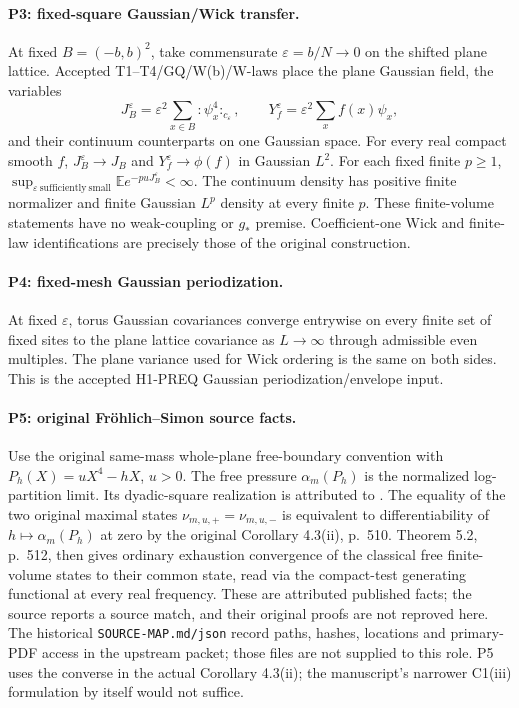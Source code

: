 \documentclass[11pt]{article}
\theoremstyle{plain}
\theoremstyle{definition}
\theoremstyle{remark}
\newcommand{\E}{\mathbb{E}}
\begin{document}
\paragraph{P3: fixed-square Gaussian/Wick transfer.}
At fixed $B=(-b,b)^2$, take commensurate $\varepsilon=b/N\to0$ on the
shifted plane lattice. Accepted T1--T4/GQ/W(b)/W-laws place the plane
Gaussian field, the variables
\[
 J_B^\varepsilon=\varepsilon^2\sum_{x\in B}{:}\psi_x^4{:}_{c_\varepsilon},
 \qquad Y_f^\varepsilon=\varepsilon^2\sum_x f(x)\psi_x,
\]
and their continuum counterparts on one Gaussian space.
For every real compact smooth $f$, $J_B^\varepsilon\to J_B$ and
$Y_f^\varepsilon\to\phi(f)$ in Gaussian $L^2$.
For each fixed finite $p\ge1$,
$\sup_{\varepsilon\ \mathrm{sufficiently\ small}}\E e^{-puJ_B^\varepsilon}<\infty$.
The continuum density has positive finite normalizer and finite Gaussian
$L^p$ density at every finite $p$. These finite-volume statements have no
weak-coupling or $g_*$ premise. Coefficient-one Wick and finite-law
identifications are precisely those of the original construction.

\paragraph{P4: fixed-mesh Gaussian periodization.}
At fixed $\varepsilon$, torus Gaussian covariances converge entrywise on
every finite set of fixed sites to the plane lattice covariance as
$L\to\infty$ through admissible even multiples. The plane variance used
for Wick ordering is the same on both sides. This is the accepted H1-PREQ
Gaussian periodization/envelope input.

\paragraph{P5: original Fr\"ohlich--Simon source facts.}
Use the original same-mass whole-plane free-boundary convention with
$P_h(X)=uX^4-hX$, $u>0$. The free pressure $\alpha_m(P_h)$ is the
normalized log-partition limit. Its dyadic-square realization is attributed
to \citet[Proposition 2.1 and the remark after (2.3), pp.~502--503]{FS1977}.
The equality of the two original maximal states
$\nu_{m,u,+}=\nu_{m,u,-}$ is equivalent to differentiability of
$h\mapsto\alpha_m(P_h)$ at zero by the original Corollary 4.3(ii), p.~510.
Theorem 5.2, p.~512, then gives ordinary exhaustion convergence of the
classical free finite-volume states to their common state, read via the
compact-test generating functional at every real frequency.
These are attributed published facts; the source reports a source match,
and their original proofs are not reproved here. The historical
\texttt{SOURCE-MAP.md/json} record paths, hashes, locations and primary-PDF
access in the upstream packet; those files are not supplied to this role.
P5 uses the converse in the actual Corollary 4.3(ii); the manuscript's
narrower C1(iii) formulation by itself would not suffice.
\end{document}
